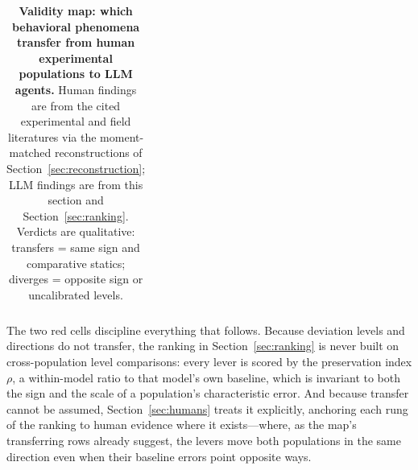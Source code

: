 \begin{table}[!htbp]
\begin{tabularx}{\textwidth}{>{\raggedright\arraybackslash}p{2.55cm} >{\raggedright\arraybackslash}X >{\raggedright\arraybackslash}X >{\raggedright\arraybackslash}p{1.75cm}}
\bottomrule
\end{tabularx}
\caption{\textbf{Validity map: which behavioral phenomena transfer from human experimental populations to LLM agents.} Human findings are from the cited experimental and field literatures via the moment-matched reconstructions of Section~\ref{sec:reconstruction}; LLM findings are from this section and Section~\ref{sec:ranking}. Verdicts are qualitative: transfers = same sign and comparative statics; diverges = opposite sign or uncalibrated levels. }
\label{tab:validity-map}
\end{table}

The two red cells discipline everything that follows. Because deviation levels and directions do not transfer, the ranking in Section~\ref{sec:ranking} is never built on cross-population level comparisons: every lever is scored by the preservation index $\rho$, a within-model ratio to that model's own baseline, which is invariant to both the sign and the scale of a population's characteristic error. And because transfer cannot be assumed, Section~\ref{sec:humans} treats it explicitly, anchoring each rung of the ranking to human evidence where it exists---where, as the map's transferring rows already suggest, the levers move both populations in the same direction even when their baseline errors point opposite ways.
